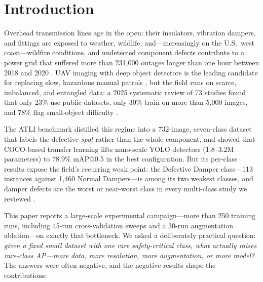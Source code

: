 \documentclass[conference]{IEEEtran}
\makeatletter
\newcommand{\dd}{Defective Damper}
\newcommand{\map}{mAP@0.5}
\makeatother
\begin{document}
\section{Introduction}
Overhead transmission lines age in the open: their insulators, vibration dampers, and fittings are exposed to weather, wildlife, and---increasingly on the U.S.\ west coast---wildfire conditions, and undetected component defects contribute to a power grid that suffered more than 231{,}000 outages longer than one hour between 2018 and 2020 \cite{do2023outages}. UAV imaging with deep object detectors is the leading candidate for replacing slow, hazardous manual patrols \cite{nguyen2018autonomous,liu2020review,yang2020powerline}, but the field runs on scarce, imbalanced, and entangled data: a 2025 systematic review of 73 studies found that only 23\% use public datasets, only 30\% train on more than 5{,}000 images, and 78\% flag small-object difficulty \cite{faisal2025powerline}.

The ATLI benchmark \cite{tsai2025atli} distilled this regime into a 732-image, seven-class dataset that labels the defective \emph{spot} rather than the whole component, and showed that COCO-based transfer learning lifts nano-scale YOLO detectors (1.8--3.2M parameters) to 78.9\% \map{} in the best configuration. But its per-class results expose the field's recurring weak point: the \dd{} class---113 instances against 1{,}460 Normal Dampers---is among its two weakest classes, and damper defects are the worst or near-worst class in every multi-class study we reviewed \cite{zhang2024dsanet,su2024cessd,zhang2024hcvit,maduako2022felect,siddiqui2020drone}.

This paper reports a large-scale experimental campaign---more than 250 training runs, including 45-run cross-validation sweeps and a 30-run augmentation ablation---on exactly that bottleneck. We asked a deliberately practical question: \emph{given a fixed small dataset with one rare safety-critical class, what actually raises rare-class AP---more data, more resolution, more augmentation, or more model?} The answers were often negative, and the negative results shape the contributions:
\end{document}
